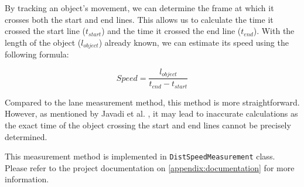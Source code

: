 By tracking an object's movement, we can determine the frame at which it crosses both the start and end lines. This allows us to calculate the time it crossed the start line ($t_{start}$) and the time it crossed the end line ($t_{end}$). With the length of the object ($l_{object}$) already known, we can estimate its speed using the following formula:

\begin{equation}
    Speed = \frac{l_{object}}{t_{end} - t_{start}}
\end{equation}

Compared to the lane measurement method, this method is more straightforward. However, as mentioned by Javadi et al. \cite{Javadi2019}, it may lead to inaccurate calculations as the exact time of the object crossing the start and end lines cannot be precisely determined.

This measurement method is implemented in \texttt{DistSpeedMeasurement} class. Please refer to the project documentation on \ref{appendix:documentation} for more information.
















